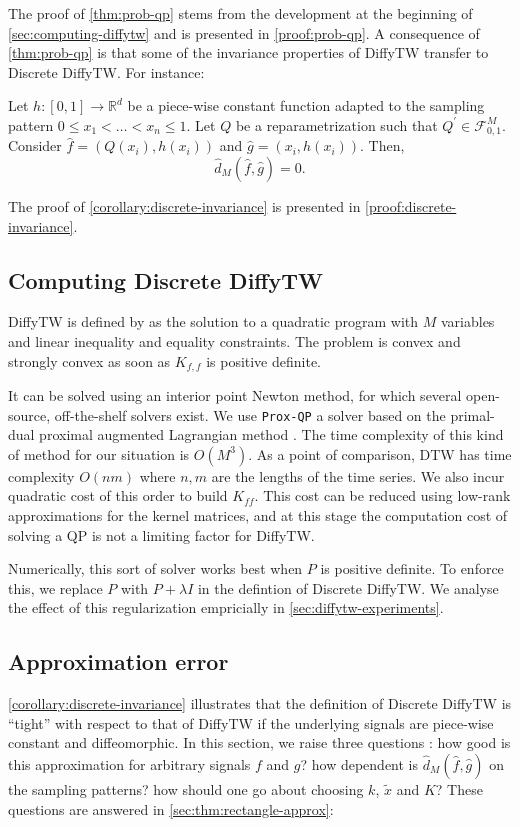 The proof of \cref{thm:prob-qp} stems from the development at the beginning of \cref{sec:computing-diffytw} and is presented in \cref{proof:prob-qp}. A consequence of \cref{thm:prob-qp} is that some of the invariance properties of DiffyTW transfer to Discrete DiffyTW. For instance:

\begin{corollary}\label{corollary:discrete-invariance}
Let $h: [0, 1] \to \mathbb R^d$ be a piece-wise constant function adapted to the sampling pattern $0 \leq x_1 < \ldots < x_n \leq 1$. Let $Q$ be a reparametrization such that $Q^\prime \in \mathcal F_{0,1}^M$. Consider $\hat f = (Q(x_i), h(x_i))$ and $\hat g = (x_i, h(x_i))$. Then,
\begin{equation}
    \hat d_M(\hat f, \hat g) = 0.
\end{equation}
\end{corollary}
The proof of \cref{corollary:discrete-invariance} is presented in \cref{proof:discrete-invariance}.

\subsection{Computing Discrete DiffyTW}\label{sec:solving-qp}

DiffyTW is defined by  as the solution to a quadratic program with $M$ variables and linear inequality and equality constraints. The problem is convex and strongly convex as soon as $K_{f,f}$ is positive definite.

It can be solved using an interior point Newton method, for which several open-source, off-the-shelf solvers exist. We use \texttt{Prox-QP} a solver based on the primal-dual proximal augmented Lagrangian method \citep{fabian}. The time complexity of this kind of method for our situation is $O(M^3)$. As a point of comparison, DTW has time complexity $O(nm)$ where $n, m$ are the lengths of the time series. We also incur quadratic cost of this order to build $K_{ff}$. This cost can be reduced using low-rank approximations for the kernel matrices, and at this stage the computation cost of solving a QP is not a limiting factor for DiffyTW.

Numerically, this sort of solver works best when $P$ is positive definite. To enforce this, we replace $P$ with $P + \lambda I$ in the defintion of Discrete DiffyTW. We analyse the effect of this regularization empricially in \cref{sec:diffytw-experiments}.

\subsection{Approximation error}
\cref{corollary:discrete-invariance} illustrates that the definition of Discrete DiffyTW is ``tight'' with respect to that of DiffyTW if the underlying signals are piece-wise constant and diffeomorphic. In this section, we raise three questions : how good is this approximation for arbitrary signals $f$ and $g$? how dependent is $\hat d_M(\hat f, \hat g)$ on the sampling patterns? how should one go about choosing $k$, $\tilde x$ and $K$? These questions are answered in \cref{sec:thm:rectangle-approx}:

